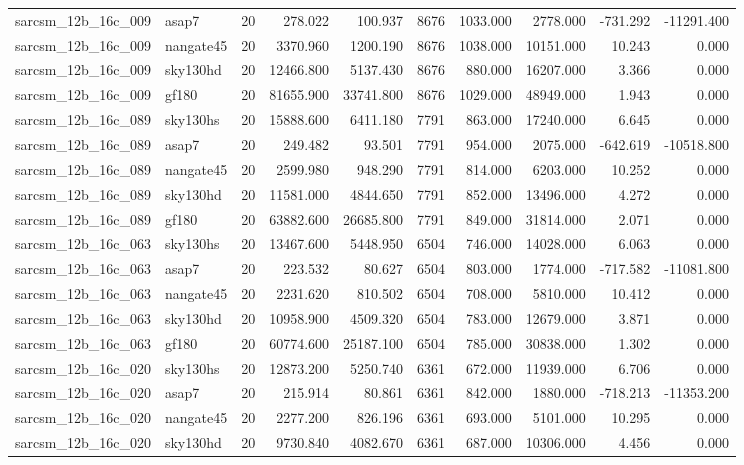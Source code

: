 \documentclass{article}
\begin{document}
\begin{longtable}{llrrrrrrrr}
sarcsm\_12b\_16c\_009 & asap7 & 20 & 278.022 & 100.937 & 8676 & 1033.000 & 2778.000 & -731.292 & -11291.400 \\
sarcsm\_12b\_16c\_009 & nangate45 & 20 & 3370.960 & 1200.190 & 8676 & 1038.000 & 10151.000 & 10.243 & 0.000 \\
sarcsm\_12b\_16c\_009 & sky130hd & 20 & 12466.800 & 5137.430 & 8676 & 880.000 & 16207.000 & 3.366 & 0.000 \\
sarcsm\_12b\_16c\_009 & gf180 & 20 & 81655.900 & 33741.800 & 8676 & 1029.000 & 48949.000 & 1.943 & 0.000 \\
sarcsm\_12b\_16c\_089 & sky130hs & 20 & 15888.600 & 6411.180 & 7791 & 863.000 & 17240.000 & 6.645 & 0.000 \\
sarcsm\_12b\_16c\_089 & asap7 & 20 & 249.482 & 93.501 & 7791 & 954.000 & 2075.000 & -642.619 & -10518.800 \\
sarcsm\_12b\_16c\_089 & nangate45 & 20 & 2599.980 & 948.290 & 7791 & 814.000 & 6203.000 & 10.252 & 0.000 \\
sarcsm\_12b\_16c\_089 & sky130hd & 20 & 11581.000 & 4844.650 & 7791 & 852.000 & 13496.000 & 4.272 & 0.000 \\
sarcsm\_12b\_16c\_089 & gf180 & 20 & 63882.600 & 26685.800 & 7791 & 849.000 & 31814.000 & 2.071 & 0.000 \\
sarcsm\_12b\_16c\_063 & sky130hs & 20 & 13467.600 & 5448.950 & 6504 & 746.000 & 14028.000 & 6.063 & 0.000 \\
sarcsm\_12b\_16c\_063 & asap7 & 20 & 223.532 & 80.627 & 6504 & 803.000 & 1774.000 & -717.582 & -11081.800 \\
sarcsm\_12b\_16c\_063 & nangate45 & 20 & 2231.620 & 810.502 & 6504 & 708.000 & 5810.000 & 10.412 & 0.000 \\
sarcsm\_12b\_16c\_063 & sky130hd & 20 & 10958.900 & 4509.320 & 6504 & 783.000 & 12679.000 & 3.871 & 0.000 \\
sarcsm\_12b\_16c\_063 & gf180 & 20 & 60774.600 & 25187.100 & 6504 & 785.000 & 30838.000 & 1.302 & 0.000 \\
sarcsm\_12b\_16c\_020 & sky130hs & 20 & 12873.200 & 5250.740 & 6361 & 672.000 & 11939.000 & 6.706 & 0.000 \\
sarcsm\_12b\_16c\_020 & asap7 & 20 & 215.914 & 80.861 & 6361 & 842.000 & 1880.000 & -718.213 & -11353.200 \\
sarcsm\_12b\_16c\_020 & nangate45 & 20 & 2277.200 & 826.196 & 6361 & 693.000 & 5101.000 & 10.295 & 0.000 \\
sarcsm\_12b\_16c\_020 & sky130hd & 20 & 9730.840 & 4082.670 & 6361 & 687.000 & 10306.000 & 4.456 & 0.000 \\

\end{longtable}
\end{document}
